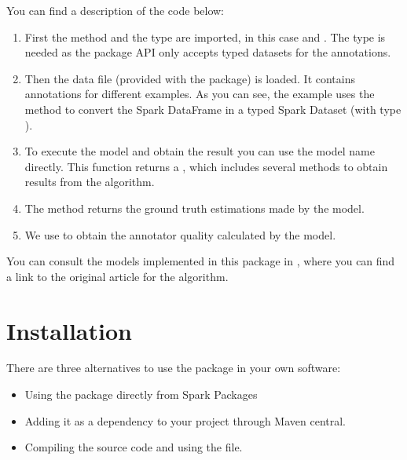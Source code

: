 \documentclass[letterpaper,10pt,english]{sphinxmanual}
\begin{document}
You can find a description of the code below:
\begin{enumerate}
\def\theenumi{\arabic{enumi}}
\def\labelenumi{\theenumi .}
\makeatletter\def\p@enumii{\p@enumi \theenumi .}\makeatother
\item {} 
First the method and the type are imported, in this case  and . The type is needed
as the package API only accepts typed datasets for the annotations. 

\item {} 
Then the data file (provided with the package) is loaded. It contains annotations for different examples. As you can see,  
the example uses the method  to convert the Spark DataFrame in a typed Spark Dataset (with type ).

\item {} 
To execute the model and obtain the result you can use the model name directly.
This function returns a , which includes several methods to obtain results from the algorithm.

\item {} 
The method  returns the ground truth estimations made by the model.

\item {} 
We use  to obtain the annotator quality calculated by the model.

\end{enumerate}

You can consult the models implemented in this package in {\hyperref[\detokenize{package/methods:methods}]{}}, where you can find a link to the
original article for the algorithm.


\chapter{Installation}
\label{\detokenize{usage/installation:installation}}\label{\detokenize{usage/installation:id1}}\label{\detokenize{usage/installation::doc}}
There are three alternatives to use the package in your own software:
\begin{itemize}
\item {} 
Using the package directly from Spark Packages 

\item {} 
Adding it as a dependency to your project through Maven central.

\item {} 
Compiling the source code and using the  file.

\end{itemize}
\end{document}
